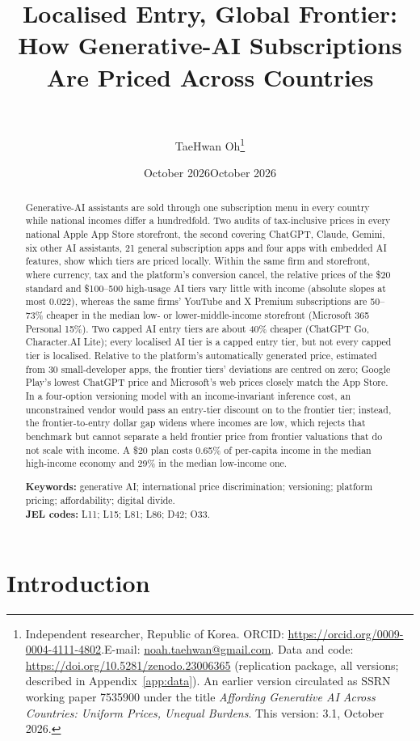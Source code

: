 \documentclass[11pt]{article}
\title{\textbf{Localised Entry, Global Frontier:\\ How Generative-AI Subscriptions Are Priced Across Countries}}
\author{~}
\date{October 2026}
\author{TaeHwan Oh\thanks{Independent researcher, Republic of Korea. ORCID: \href{https://orcid.org/0009-0004-4111-4802}{https://orcid.org/0009-0004-4111-4802}.\newline E-mail: \href{mailto:noah.taehwan@gmail.com}{noah.taehwan@gmail.com}. Data and code: \href{https://doi.org/10.5281/zenodo.23006365}{https://doi.org/10.5281/zenodo.23006365} (replication package, all versions; described in Appendix~\ref{app:data}). An earlier version circulated as SSRN working paper 7535900 under the title \emph{Affording Generative AI Across Countries: Uniform Prices, Unequal Burdens}. This version: 3.1, October 2026.}}
\date{October 2026}
\theoremstyle{definition}
\theoremstyle{remark}
\begin{document}
\maketitle

\begin{abstract}
\noindent Generative-AI assistants are sold through one subscription menu in every country while national incomes differ a hundredfold. Two audits of tax-inclusive prices in every national Apple App Store storefront, the second covering ChatGPT, Claude, Gemini, six other AI assistants, 21 general subscription apps and four apps with embedded AI features, show which tiers are priced locally. Within the same firm and storefront, where currency, tax and the platform's conversion cancel, the relative prices of the \$20 standard and \$100--500 high-usage AI tiers vary little with income (absolute slopes at most 0.022), whereas the same firms' YouTube and X Premium subscriptions are 50--73\% cheaper in the median low- or lower-middle-income storefront (Microsoft 365 Personal 15\%). Two capped AI entry tiers are about 40\% cheaper (ChatGPT Go, Character.AI Lite); every localised AI tier is a capped entry tier, but not every capped tier is localised. Relative to the platform's automatically generated price, estimated from 30 small-developer apps, the frontier tiers' deviations are centred on zero; Google Play's lowest ChatGPT price and Microsoft's web prices closely match the App Store. In a four-option versioning model with an income-invariant inference cost, an unconstrained vendor would pass an entry-tier discount on to the frontier tier; instead, the frontier-to-entry dollar gap widens where incomes are low, which rejects that benchmark but cannot separate a held frontier price from frontier valuations that do not scale with income. A \$20 plan costs 0.65\% of per-capita income in the median high-income economy and 29\% in the median low-income one.

\medskip
\noindent\textbf{Keywords:} generative AI; international price discrimination; versioning; platform pricing; affordability; digital divide.\\
\noindent\textbf{JEL codes:} L11; L15; L81; L86; D42; O33.
\end{abstract}

\newpage
\section{Introduction}\label{sec:intro}
\end{document}
